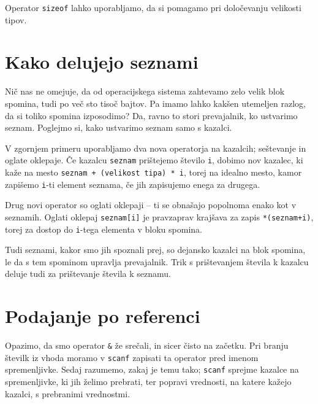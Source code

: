 \documentclass{book}
\begin{document}
\begin{examples}
  Operator \verb+sizeof+ lahko uporabljamo, da si pomagamo pri določevanju
  velikosti tipov.
\end{examples}

\newpage
\section{Kako delujejo seznami}

Nič nas ne omejuje, da od operacijskega sistema zahtevamo zelo velik blok
spomina, tudi po več sto tisoč bajtov. Pa imamo lahko kakšen utemeljen razlog,
da si toliko spomina izposodimo? Da, ravno to stori prevajalnik, ko ustvarimo
seznam. Poglejmo si, kako ustvarimo seznam samo s kazalci.

\begin{examples}
\end{examples}

V zgornjem primeru uporabljamo dva nova operatorja na kazalcih; seštevanje in
oglate oklepaje. Če kazalcu \verb+seznam+ prištejemo število \verb+i+, dobimo
nov kazalec, ki kaže na mesto \verb|seznam + (velikost tipa) * i|, torej na
idealno mesto, kamor zapišemo \verb+i+-ti element seznama, če jih zapisujemo
enega za drugega.

Drug novi operator so oglati oklepaji -- ti se obnašajo popolnoma enako kot
v seznamih. Oglati oklepaj \verb+seznam[i]+ je pravzaprav krajšava za zapis
\verb|*(seznam+i)|, torej za dostop do \verb+i+-tega elementa v bloku spomina.

Tudi seznami, kakor smo jih spoznali prej, so dejansko kazalci na blok spomina,
le da s tem spominom upravlja prevajalnik. Trik s prištevanjem števila k
kazalcu deluje tudi za prištevanje števila k seznamu.

\section{Podajanje po referenci}

Opazimo, da smo operator \verb+&+ že srečali, in sicer čisto na začetku.
Pri branju številk iz vhoda moramo v \verb+scanf+ zapisati ta operator pred
imenom spremenljivke. Sedaj razumemo, zakaj je temu tako; \verb+scanf+ sprejme
kazalce na spremenljivke, ki jih želimo prebrati, ter popravi vrednosti, na
katere kažejo kazalci, s prebranimi vrednostmi.
\end{document}
